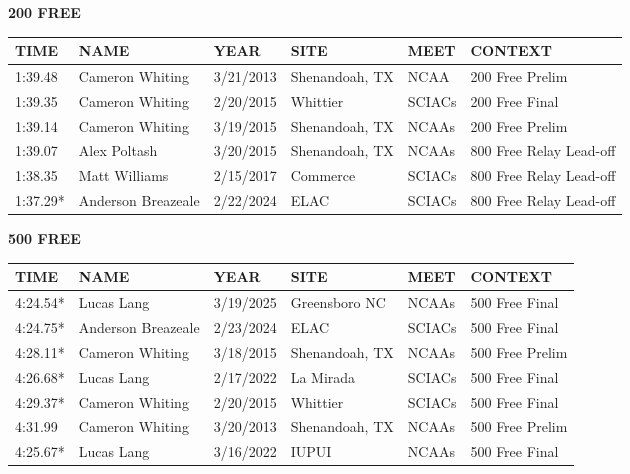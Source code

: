 \begin{minipage}[t]{0.48\textwidth}
\centering
\textbf{200 FREE}\\[0.05cm]
\begin{tabular}{@{}p{1.8cm}p{2.8cm}p{1.2cm}p{1.4cm}p{1.4cm}p{2.0cm}@{}}
\hline
\textbf{TIME} & \textbf{NAME} & \textbf{YEAR} & \textbf{SITE} & \textbf{MEET} & \textbf{CONTEXT} \\
\hline
1:39.48 & Cameron Whiting & 3/21/2013 & Shenandoah, TX & NCAA & 200 Free Prelim \\
1:39.35 & Cameron Whiting & 2/20/2015 & Whittier & SCIACs & 200 Free Final \\
1:39.14 & Cameron Whiting & 3/19/2015 & Shenandoah, TX & NCAAs & 200 Free Prelim \\
1:39.07 & Alex Poltash & 3/20/2015 & Shenandoah, TX & NCAAs & 800 Free Relay Lead-off \\
1:38.35 & Matt Williams & 2/15/2017 & Commerce & SCIACs & 800 Free Relay Lead-off \\
1:37.29* & Anderson Breazeale & 2/22/2024 & ELAC & SCIACs & 800 Free Relay Lead-off \\
\hline
\end{tabular}
\end{minipage}\hfill
\begin{minipage}[t]{0.48\textwidth}
\centering
\textbf{500 FREE}\\[0.05cm]
\begin{tabular}{@{}p{1.8cm}p{2.8cm}p{1.2cm}p{1.4cm}p{1.4cm}p{2.0cm}@{}}
\hline
\textbf{TIME} & \textbf{NAME} & \textbf{YEAR} & \textbf{SITE} & \textbf{MEET} & \textbf{CONTEXT} \\
\hline
4:24.54* & Lucas Lang & 3/19/2025 & Greensboro NC & NCAAs & 500 Free Final \\
4:24.75* & Anderson Breazeale & 2/23/2024 & ELAC & SCIACs & 500 Free Final \\
4:28.11* & Cameron Whiting & 3/18/2015 & Shenandoah, TX & NCAAs & 500 Free Prelim \\
4:26.68* & Lucas Lang & 2/17/2022 & La Mirada & SCIACs & 500 Free Final \\
4:29.37* & Cameron Whiting & 2/20/2015 & Whittier & SCIACs & 500 Free Final \\
4:31.99 & Cameron Whiting & 3/20/2013 & Shenandoah, TX & NCAAs & 500 Free Prelim \\
4:25.67* & Lucas Lang & 3/16/2022 & IUPUI & NCAAs & 500 Free Final \\
\hline
\end{tabular}
\end{minipage}

